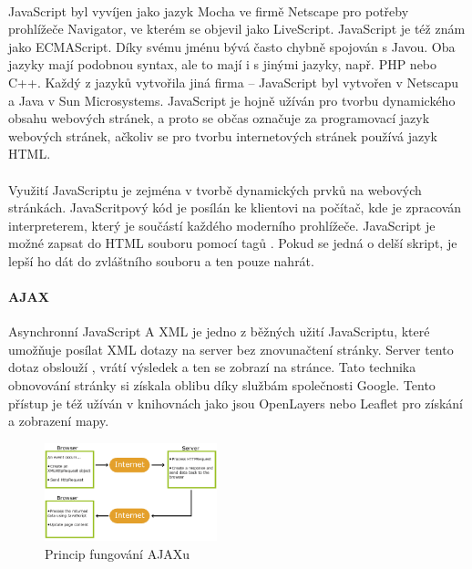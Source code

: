 \documentclass[11pt,a4paper,titlepage,oneside]{book}
\begin{document}
		\paragraph{} JavaScript byl vyvíjen jako jazyk Mocha ve firmě Netscape pro potřeby prohlížeče Navigator, ve kterém se objevil jako LiveScript. JavaScript je též znám jako ECMAScript. Díky svému jménu bývá často chybně spojován s Javou. Oba jazyky mají podobnou syntax, ale to mají i s jinými jazyky, např. PHP nebo C++. Každý z jazyků vytvořila jiná firma -- JavaScript byl vytvořen v Netscapu a Java v Sun Microsystems. JavaScript je hojně užíván pro tvorbu dynamického obsahu webových stránek, a proto se občas označuje za programovací jazyk webových stránek, ačkoliv se pro tvorbu internetových stránek používá jazyk HTML.

		\paragraph{} Využití JavaScriptu je zejména v tvorbě dynamických prvků na webových stránkách. JavaScritpový kód je posílán ke klientovi na počítač, kde je zpracován\label{fig:client} interpreterem, který je součástí každého moderního prohlížeče. JavaScript je možné zapsat do HTML souboru pomocí tagů . Pokud se jedná o delší skript, je lepší ho dát do zvláštního souboru a ten pouze nahrát.
		\paragraph{AJAX} Asynchronní JavaScript A XML je jedno z běžných užití JavaScriptu, které umožňuje posílat XML dotazy na server bez znovunačtení stránky. Server tento dotaz obslouží , vrátí výsledek a ten se zobrazí na stránce. Tato technika obnovování stránky si získala oblibu díky službám společnosti Google. Tento přístup je též užíván v knihovnách jako jsou OpenLayers nebo Leaflet pro získání a zobrazení mapy.

		\begin{figure}[!h]
			\begin{center}
				\includegraphics[width=5cm]{obrazky/ajax.png}
				\caption{Princip fungování AJAXu}
				\label{fig:ajax}
			\end{center}
		\end{figure}	
\end{document}
